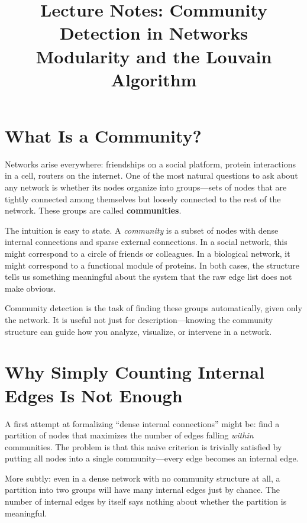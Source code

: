 \documentclass[11pt]{article}
\title{\textbf{Lecture Notes: Community Detection in Networks}\\
\large Modularity and the Louvain Algorithm}
\author{}
\date{}
\theoremstyle{definition}
\begin{document}
\maketitle
\tableofcontents
\newpage

\section{What Is a Community?}

Networks arise everywhere: friendships on a social platform, protein interactions in a cell, routers on the internet. One of the most natural questions to ask about any network is whether its nodes organize into groups---sets of nodes that are tightly connected among themselves but loosely connected to the rest of the network. These groups are called \textbf{communities}.

The intuition is easy to state. A \emph{community} is a subset of nodes with dense internal connections and sparse external connections. In a social network, this might correspond to a circle of friends or colleagues. In a biological network, it might correspond to a functional module of proteins. In both cases, the structure tells us something meaningful about the system that the raw edge list does not make obvious.

Community detection is the task of finding these groups automatically, given only the network. It is useful not just for description---knowing the community structure can guide how you analyze, visualize, or intervene in a network.

\section{Why Simply Counting Internal Edges Is Not Enough}

A first attempt at formalizing ``dense internal connections'' might be: find a partition of nodes that maximizes the number of edges falling \emph{within} communities. The problem is that this naive criterion is trivially satisfied by putting all nodes into a single community---every edge becomes an internal edge.

More subtly: even in a dense network with no community structure at all, a partition into two groups will have many internal edges just by chance. The number of internal edges by itself says nothing about whether the partition is meaningful.
\end{document}
